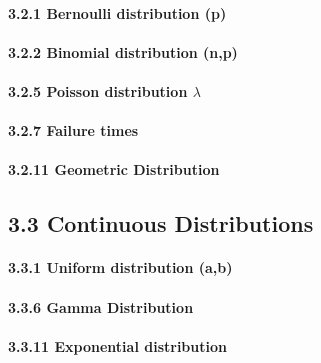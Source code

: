 \documentclass[6pt,twocolumn,Portrait]{article}
\let\oldparagraph\paragraph
\renewcommand{\paragraph}[1]{\oldparagraph{#1}\mbox{}}
\begin{document}
\hypertarget{Bern}{%
\paragraph{3.2.1 Bernoulli distribution (p)}\label{Bern}}

\hypertarget{Bino}{%
\paragraph{3.2.2 Binomial distribution (n,p)}\label{Bino}}

\hypertarget{Pois}{%
\paragraph{\texorpdfstring{3.2.5 Poisson distribution
\(\lambda\)}{3.2.5 Poisson distribution \textbackslash{}lambda}}\label{Pois}}

\hypertarget{failtime}{%
\paragraph{3.2.7 Failure times}\label{failtime}}

\hypertarget{Geom}{%
\paragraph{3.2.11 Geometric Distribution}\label{Geom}}

\hypertarget{continuous-distributions}{%
\subsection{3.3 Continuous
Distributions}\label{continuous-distributions}}

\hypertarget{Unif}{%
\paragraph{3.3.1 Uniform distribution (a,b)}\label{Unif}}

\hypertarget{Gamma}{%
\paragraph{3.3.6 Gamma Distribution}\label{Gamma}}

\hypertarget{Expo}{%
\paragraph{3.3.11 Exponential distribution}\label{Expo}}
\end{document}
